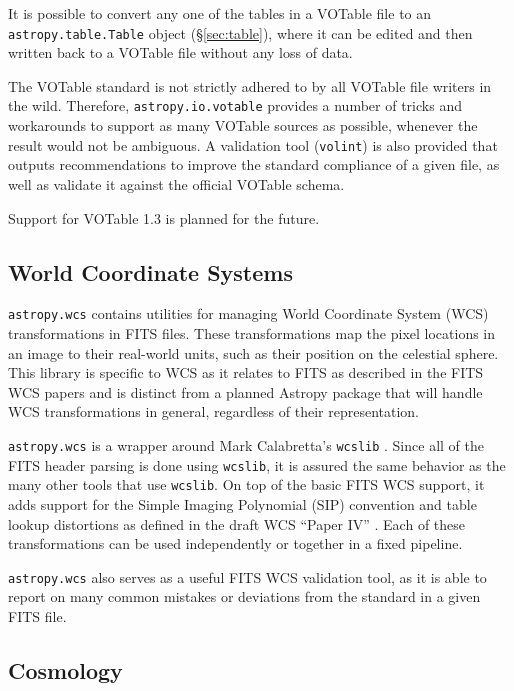 \documentclass[traditabstract]{aa}
\begin{document}
It is possible to convert any one of the tables in a VOTable file to
an \texttt{astropy.table.Table} object (\S\ref{sec:table}), where it
can be edited and then written back to a VOTable file without any loss
of data.

The VOTable standard is not strictly adhered to by all VOTable file
writers in the wild.  Therefore, \texttt{astropy.io.votable} provides
a number of tricks and workarounds to support as many VOTable sources
as possible, whenever the result would not be ambiguous.  A validation
tool (\texttt{volint}) is also provided that outputs recommendations
to improve the standard compliance of a given file, as well as
validate it against the official VOTable schema.

Support for VOTable 1.3 is planned for the future.

\subsection{World Coordinate Systems}


\texttt{astropy.wcs} contains utilities for managing World Coordinate
System (WCS) transformations in FITS files.  These transformations map
the pixel locations in an image to their real-world units, such as
their position on the celestial sphere.  This library is specific to
WCS as it relates to FITS as described in the FITS WCS papers
\citep{greisen2002wcs,calabretta2002wcs,greisen2006wcs} and is
distinct from a planned Astropy package that will handle WCS
transformations in general, regardless of their representation.

\texttt{astropy.wcs} is a wrapper around Mark Calabretta's
\texttt{wcslib} \citep{calabretta2013wcslib}.  Since all of the FITS
header parsing is done using \texttt{wcslib}, it is assured the same
behavior as the many other tools that use \texttt{wcslib}.  On top of
the basic FITS WCS support, it adds support for the Simple Imaging
Polynomial (SIP) convention and table lookup distortions as defined in
the draft WCS ``Paper IV'' \citep{calabretta2004wcs}.  Each of these
transformations can be used independently or together in a fixed
pipeline.

\texttt{astropy.wcs} also serves as a useful FITS WCS validation tool,
as it is able to report on many common mistakes or deviations from the
standard in a given FITS file.

\subsection{Cosmology}
\end{document}
